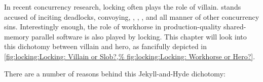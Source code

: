 
%

In recent concurrency research, locking often plays the role of villain.
 stands accused of inciting deadlocks, convoying, ,
, , and all manner of other concurrency sins.
Interestingly enough, the role of workhorse in production-quality
shared-memory parallel software is also played by locking.
This chapter will look into this dichotomy between villain and
hero, as fancifully depicted in
\cref{fig:locking:Locking: Villain or Slob?,%
fig:locking:Locking: Workhorse or Hero?}.

There are a number of reasons behind this Jekyll-and-Hyde dichotomy:

